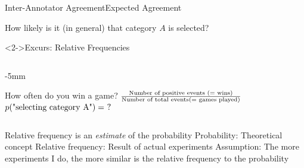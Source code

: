 \documentclass[aspectratio=169]{beamer}
\begin{document}
\begin{frame}{Inter-Annotator Agreement}{Expected Agreement}
\begin{outline}
\1 How likely is it (in general) that category $A$ is selected?
\end{outline}

\begin{block}<2->{Excurs: Relative Frequencies}
\begin{columns}[onlytextwidth,T]
\begin{column}{\dimexpr\linewidth-30mm-5mm}
\begin{outline}
 How often do you win a game?
 $\frac{\textnormal{Number of positive events (= wins)}}{\textnormal{Number of total events(= games played)}}$
 $p(\textnormal{"selecting category A"}) =\ ?$
\end{outline}
\end{column}
\end{columns}
\begin{outline}
 Relative frequency is an \emph{estimate} of the probability
\2 Probability: Theoretical concept
\2 Relative frequency: Result of actual experiments
\2 Assumption: The more experiments I do, the more similar is the relative frequency to the probability	
\end{outline}
\end{block}
\end{frame}
\end{document}
